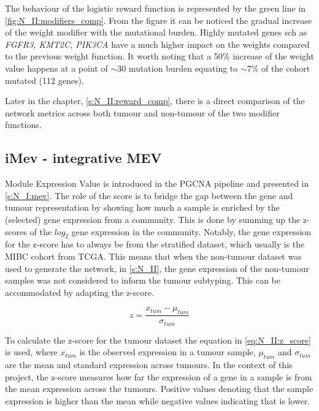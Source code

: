 The behaviour of the logistic reward function is represented by the green line in \cref{fig:N_II:modifiers_comp}. From the figure it can be noticed the gradual increase of the weight modifier with the mutational burden. Highly mutated genes sch as \textit{FGFR3, KMT2C, PIK3CA} have a much higher impact on the weights compared to the previous weight function. It worth noting that a 50\% increase of the weight value happens at a point of $\sim$30 mutation burden equating to $\sim7$\% of the cohort mutated (112 genes).

Later in the chapter, \cref{s:N_II:reward_comp}, there is a direct comparison of the network metrics across both tumour and non-tumour of the two modifier functions.



\subsection*{iMev - integrative MEV} \label{s:N_II:iMEV}

Module Expression Value is introduced in the PGCNA pipeline \citep{Care2019-ij} and presented in \cref{s:N_I:mev}. The role of the score is to bridge the gap between the gene and tumour representation by showing how much a sample is enriched by the (selected) gene expression from a community. This is done by summing up the z-scores of the $log_2$ gene expression in the community. Notably, the gene expression for the z-score has to always be from the stratified dataset, which usually is the MIBC cohort from TCGA. This means that when the non-tumour dataset was used to generate the network, in \cref{s:N_II}, the gene expression of the non-tumour samples was not considered to inform the tumour subtyping. This can be accommodated by adapting the z-score.

\begin{equation} \label{eq:N_II:z_score}
z = \frac{x_{tum} - \mu_{tum}}{\sigma_{tum}}
\end{equation}

To calculate the z-score for the tumour dataset the equation in \cref{eq:N_II:z_score} is used, where $x_{tum}$ is the observed expression in a tumour sample, $\mu_{tum}$ and $\sigma_{tum}$ are the mean and standard expression across tumours. In the context of this project, the z-score measures how far the expression of a gene in a sample is from the mean expression across the tumours. Positive values denoting that the sample expression is higher than the mean while negative values indicating that is lower.


